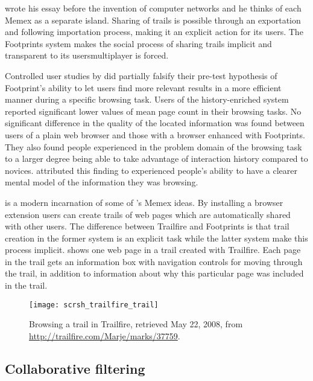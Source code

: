 \citeauthor{bush45} wrote his essay before the invention of computer networks
and he thinks of each Memex as a separate island. Sharing of trails is
possible through an exportation and following importation process, making it an
explicit action for its users.
The Footprints system makes the social process of sharing trails implicit and
transparent to its users\dash{}multiplayer is forced.

Controlled user studies by \citeauthor{wexelblat99} did partially falsify
their pre-test hypothesis of Footprint's ability to let users find more
relevant results in a more efficient manner during a specific browsing task.
Users of the history-enriched system reported significant lower values of mean
page count in their browsing tasks. No significant difference in the quality
of the located information was found between users of a
plain web browser and those with a browser enhanced with Footprints.
They also found people experienced in the problem domain of the browsing task
to a larger degree being able to take advantage of interaction history
compared to novices.
\citeauthor{wexelblat99} attributed this finding to experienced people's
ability to have a clearer mental model of the information they was browsing.

%
is a modern incarnation of some of \citeauthor{bush45}'s Memex ideas.
By installing a browser extension users can
create trails of web pages which are automatically shared with other users.
The difference between Trailfire and Footprints is that trail creation in the
former system is an explicit task while the latter system make this process
implicit.  shows one web page in a trail
created with Trailfire. Each page in the trail gets an information box with
navigation controls for moving through the trail, in addition to information
about why this particular page was included in the trail.

\begin{figure}
  \texttt{[image: scrsh\_trailfire\_trail]}
  \caption[Trailfire Trail]{
    Browsing a trail in Trailfire,
    retrieved May 22, 2008, from
    \url{http://trailfire.com/Marje/marks/37759}.
  }
  \label{figure:scrsh.trailfire.trail}
\end{figure}

\subsection{Collaborative filtering}
\label{section:navigation.applied.forms.collaborative.filtering}

